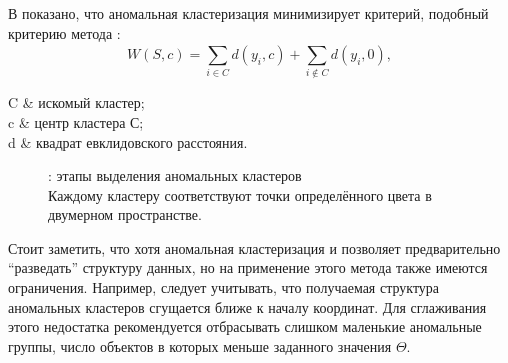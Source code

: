 \documentclass[12pt]{diploma}
\begin{document}
	В \cite{mirkin-ds} показано, что аномальная кластеризация минимизирует критерий, подобный критерию метода \kmeans:
	\begin{equation*}
		W(S,c) = \sum_{i \in C}^{} d(y_i,c) + \sum_{i \notin C}^{} d(y_i,0),
	\end{equation*}
	\begin{conditions}
		 C     &  искомый кластер; \\
		 c     &  центр кластера $ С $; \\
		 d     &  квадрат евклидовского расстояния.\\  
	\end{conditions}

	\begin{figure} %
		\centering
		\caption{\ikmeans: этапы выделения аномальных кластеров
			\\ {\small Каждому кластеру соответствуют точки определённого цвета в двумерном пространстве.}}
		\label{fig:ikmeans-working}
	\end{figure}

	Стоит заметить, что хотя аномальная кластеризация и позволяет предварительно ``разведать'' структуру данных, но на применение этого метода также имеются ограничения. Например, следует учитывать, что получаемая структура аномальных кластеров сгущается ближе к началу координат. Для сглаживания этого недостатка рекомендуется отбрасывать слишком маленькие аномальные группы, число объектов в которых меньше заданного значения $ \Theta $. 
	
\end{document}
